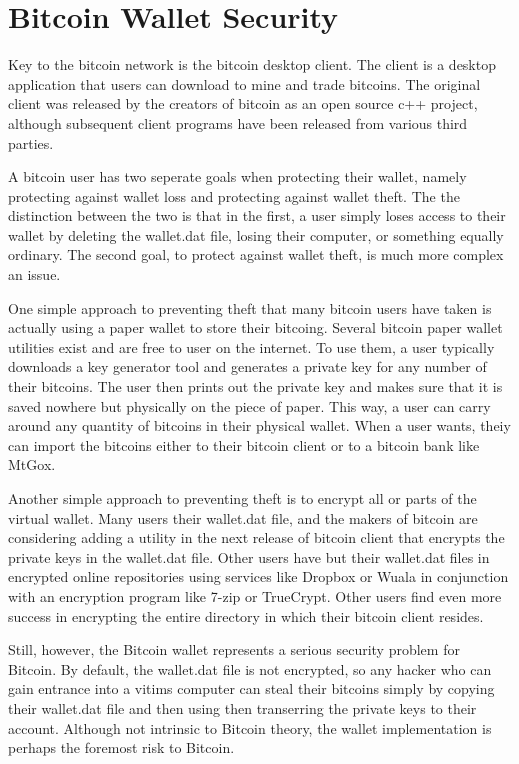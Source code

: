 \documentclass{report}
\begin{document}
\section*{Bitcoin Wallet Security}
Key to the bitcoin network is the bitcoin desktop client.  The client is a desktop
application that users can download to mine and trade bitcoins.  The original client
was released by the creators of bitcoin as an open source c++ project\cite{Andresen:source}, although
subsequent client programs have been released from various third parties.  

A bitcoin user has two seperate goals when protecting their wallet, namely protecting
against wallet loss and protecting against wallet theft.  The the distinction between 
the two is that in the first, a user simply loses access to their wallet by deleting 
the wallet.dat file, losing their computer, or something equally ordinary.  The second 
goal, to protect against wallet theft, is much more complex an issue.

One simple approach to preventing theft that many bitcoin users have taken is actually 
using a paper wallet to store their bitcoing.  Several bitcoin paper wallet utilities 
exist and are free to user on the internet.  To use them, a user typically downloads a 
key generator tool and generates a private key for any number of their bitcoins.  The 
user then prints out the private key and makes sure that it is saved nowhere but 
physically on the piece of paper.  This way, a user can carry around any quantity of 
bitcoins in their physical wallet.  When a user wants, theiy can import the bitcoins 
either to their bitcoin client or to a bitcoin bank like MtGox.

Another simple approach to preventing theft is to encrypt all or parts of the virtual 
wallet.  Many users their wallet.dat file, and the makers of bitcoin are considering 
adding a utility in the next release of bitcoin client that encrypts the private keys 
in the wallet.dat file.  Other users have but their wallet.dat files in encrypted online 
repositories using services like Dropbox or Wuala in conjunction with an encryption 
program like 7-zip or TrueCrypt.  Other users find even more success in encrypting the 
entire directory in which their bitcoin client resides.

Still, however, the Bitcoin wallet represents a serious security problem for Bitcoin.  
By default, the wallet.dat file is not encrypted, so any hacker who can gain entrance 
into a vitims computer can steal their bitcoins simply by copying their wallet.dat file 
and then using then transerring the private keys to their account.  Although not intrinsic 
to Bitcoin theory, the wallet implementation is perhaps the foremost risk to Bitcoin.
\end{document}
